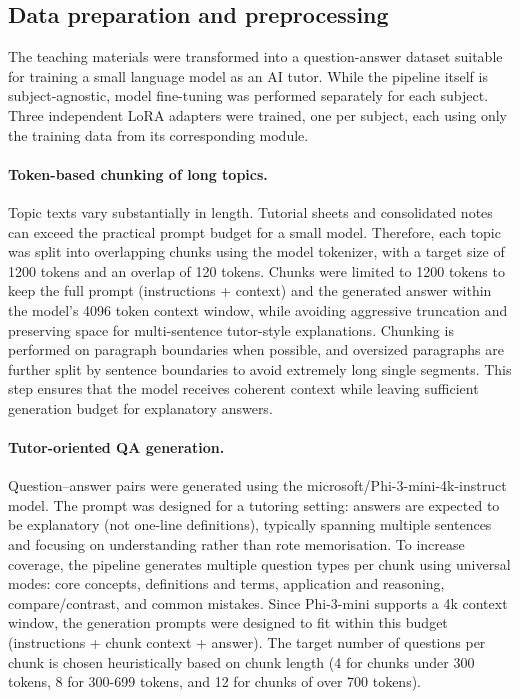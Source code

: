 \subsection{Data preparation and preprocessing}

The teaching materials were transformed into a question-answer dataset suitable for training a small language model as an AI tutor. While the pipeline itself is subject-agnostic, model fine-tuning was performed separately for each subject. Three independent LoRA adapters were trained, one per subject, each using only the training data from its corresponding module.

\paragraph{Token-based chunking of long topics.}
Topic texts vary substantially in length. Tutorial sheets and consolidated notes can exceed the practical prompt budget for a small model. Therefore, each topic was split into overlapping chunks using the model tokenizer, with a target size of 1200 tokens and an overlap of 120 tokens. Chunks were limited to 1200 tokens to keep the full prompt (instructions + context) and the generated answer within the model’s 4096 token context window, while avoiding aggressive truncation and preserving space for multi-sentence tutor-style explanations. Chunking is performed on paragraph boundaries when possible, and oversized paragraphs are further split by sentence boundaries to avoid extremely long single segments. This step ensures that the model receives coherent context while leaving sufficient generation budget for explanatory answers.

\paragraph{Tutor-oriented QA generation.}
Question–answer pairs were generated using the microsoft/Phi-3-mini-4k-instruct model. The prompt was designed for a tutoring setting: answers are expected to be explanatory (not one-line definitions), typically spanning multiple sentences and focusing on understanding rather than rote memorisation. To increase coverage, the pipeline generates multiple question types per chunk using universal modes: core concepts, definitions and terms, application and reasoning, compare/contrast, and common mistakes. Since Phi-3-mini supports a 4k context window, the generation prompts were designed to fit within this budget (instructions + chunk context + answer). The target number of questions per chunk is chosen heuristically based on chunk length (4 for chunks under 300 tokens, 8 for 300-699 tokens, and 12 for chunks of over 700 tokens).

